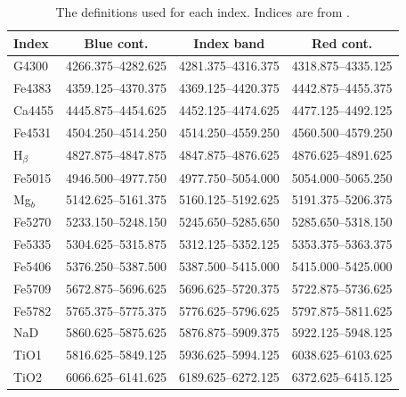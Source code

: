 		\begin{table}
			\centering
			\caption{The definitions used for each index. Indices are from \citet{Trager1998}.}
			\label{tab:abIndex}
			\begin{tabular}{l c c c}
				\hline
				\hline
				Index 	& Blue cont. 		& Index band 		& Red cont. \\
				\hline 
				G4300 	& 4266.375--4282.625 & 4281.375--4316.375 & 4318.875--4335.125 \\
				Fe4383 	& 4359.125--4370.375 & 4369.125--4420.375 & 4442.875--4455.375 \\
				Ca4455 	& 4445.875--4454.625 & 4452.125--4474.625 & 4477.125--4492.125 \\
				Fe4531 	& 4504.250--4514.250 & 4514.250--4559.250 & 4560.500--4579.250 \\
				H$_\beta$ & 4827.875--4847.875 & 4847.875--4876.625 & 4876.625--4891.625 \\
				Fe5015 	& 4946.500--4977.750 & 4977.750--5054.000 & 5054.000--5065.250 \\
				Mg$_b$ 	& 5142.625--5161.375 & 5160.125--5192.625 & 5191.375--5206.375 \\
				Fe5270 	& 5233.150--5248.150 & 5245.650--5285.650 & 5285.650--5318.150 \\
				Fe5335 	& 5304.625--5315.875 & 5312.125--5352.125 & 5353.375--5363.375 \\
				Fe5406 	& 5376.250--5387.500 & 5387.500--5415.000 & 5415.000--5425.000 \\
				Fe5709 	& 5672.875--5696.625 & 5696.625--5720.375 & 5722.875--5736.625 \\
				Fe5782 	& 5765.375--5775.375 & 5776.625--5796.625 & 5797.875--5811.625 \\
				NaD 	& 5860.625--5875.625 & 5876.875--5909.375 & 5922.125--5948.125 \\
				TiO1 	& 5816.625--5849.125 & 5936.625--5994.125 & 6038.625--6103.625 \\
				TiO2 	& 6066.625--6141.625 & 6189.625--6272.125 & 6372.625--6415.125 \\
				\hline
				\hline
			\end{tabular}
		\end{table}

